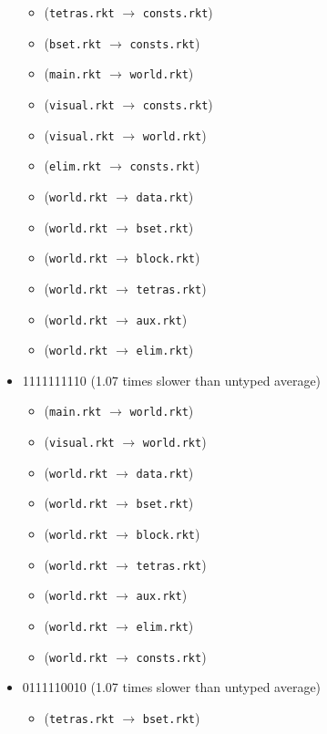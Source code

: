 \documentclass{article}
\newcommand{\mono}[1]{\texttt{#1}}
\begin{document}
\begin{itemize}
  \begin{itemize}
  \item (\mono{tetras.rkt} $\rightarrow$ \mono{consts.rkt})
  \item (\mono{bset.rkt} $\rightarrow$ \mono{consts.rkt})
  \item (\mono{main.rkt} $\rightarrow$ \mono{world.rkt})
  \item (\mono{visual.rkt} $\rightarrow$ \mono{consts.rkt})
  \item (\mono{visual.rkt} $\rightarrow$ \mono{world.rkt})
  \item (\mono{elim.rkt} $\rightarrow$ \mono{consts.rkt})
  \item (\mono{world.rkt} $\rightarrow$ \mono{data.rkt})
  \item (\mono{world.rkt} $\rightarrow$ \mono{bset.rkt})
  \item (\mono{world.rkt} $\rightarrow$ \mono{block.rkt})
  \item (\mono{world.rkt} $\rightarrow$ \mono{tetras.rkt})
  \item (\mono{world.rkt} $\rightarrow$ \mono{aux.rkt})
  \item (\mono{world.rkt} $\rightarrow$ \mono{elim.rkt})
  \end{itemize}
\item 1111111110 (1.07 times slower than untyped average)
  \begin{itemize}
  \item (\mono{main.rkt} $\rightarrow$ \mono{world.rkt})
  \item (\mono{visual.rkt} $\rightarrow$ \mono{world.rkt})
  \item (\mono{world.rkt} $\rightarrow$ \mono{data.rkt})
  \item (\mono{world.rkt} $\rightarrow$ \mono{bset.rkt})
  \item (\mono{world.rkt} $\rightarrow$ \mono{block.rkt})
  \item (\mono{world.rkt} $\rightarrow$ \mono{tetras.rkt})
  \item (\mono{world.rkt} $\rightarrow$ \mono{aux.rkt})
  \item (\mono{world.rkt} $\rightarrow$ \mono{elim.rkt})
  \item (\mono{world.rkt} $\rightarrow$ \mono{consts.rkt})
  \end{itemize}
\item 0111110010 (1.07 times slower than untyped average)
  \begin{itemize}
  \item (\mono{tetras.rkt} $\rightarrow$ \mono{bset.rkt})

\end{itemize}
\end{itemize}
\end{document}
